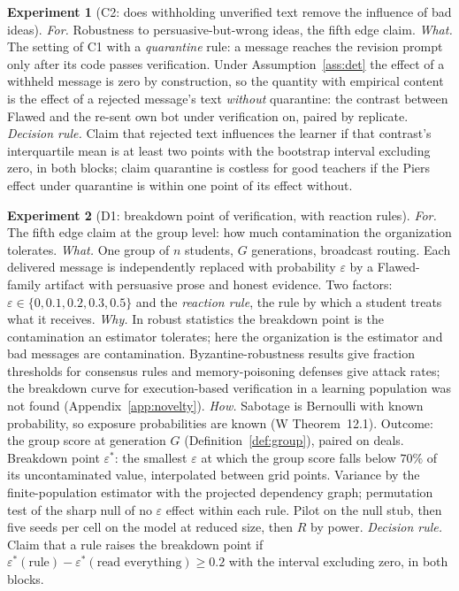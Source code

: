 \documentclass[11pt]{article}
\numberwithin{theorem}{section}
\theoremstyle{definition}
\theoremstyle{problemstyle}
\newtheorem{experiment}{Experiment}[section]
\begin{document}
\begin{experiment}[C2: does withholding unverified text remove the influence of bad ideas]
\emph{For.} Robustness to persuasive-but-wrong ideas, the fifth edge claim.
\emph{What.} The setting of C1 with a \emph{quarantine} rule: a message reaches the revision prompt only after its
code passes verification. Under Assumption~\ref{ass:det} the effect of a withheld message is zero by construction, so
the quantity with empirical content is the effect of a rejected message's text \emph{without} quarantine: the contrast
between Flawed and the re-sent own bot under verification on, paired by replicate.
\emph{Decision rule.} Claim that rejected text influences the learner if that contrast's interquartile mean is at least
two points with the bootstrap interval excluding zero, in both blocks; claim quarantine is costless for good teachers if
the Piers effect under quarantine is within one point of its effect without.
\end{experiment}

\begin{experiment}[D1: breakdown point of verification, with reaction rules]
\emph{For.} The fifth edge claim at the group level: how much contamination the organization tolerates.
\emph{What.} One group of $n$ students, $G$ generations, broadcast routing. Each delivered message is independently
replaced with probability $\varepsilon$ by a Flawed-family artifact with persuasive prose and honest evidence. Two
factors: $\varepsilon\in\{0,0.1,0.2,0.3,0.5\}$ and the \emph{reaction rule}, the rule by which a student treats what it
receives.
\emph{Why.} In robust statistics the breakdown point is the contamination an estimator tolerates; here the
organization is the estimator and bad messages are contamination. Byzantine-robustness results give fraction
thresholds for consensus rules and memory-poisoning defenses give attack rates; the breakdown curve for execution-based
verification in a learning population was not found (Appendix~\ref{app:novelty}).
\emph{How.} Sabotage is Bernoulli with known probability, so exposure probabilities are known (W Theorem~12.1).
Outcome: the group score at generation $G$ (Definition~\ref{def:group}), paired on deals. Breakdown point $\varepsilon^\ast$: the
smallest $\varepsilon$ at which the group score falls below $70\%$ of its uncontaminated value, interpolated between
grid points. Variance by the finite-population estimator with the projected dependency graph; permutation test of the
sharp null of no $\varepsilon$ effect within each rule. Pilot on the null stub, then five seeds per cell on the model
at reduced size, then $R$ by power.
\emph{Decision rule.} Claim that a rule raises the breakdown point if $\varepsilon^\ast(\text{rule}) -
\varepsilon^\ast(\text{read everything})\ge0.2$ with the interval excluding zero, in both blocks.
\end{experiment}
\end{document}

